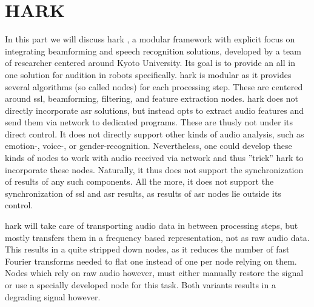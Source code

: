 
\section{HARK}
\label{related:frameworks}
In this part we will discuss \gls{hark} \cite{Nakadai_2017jrm}, a modular framework with explicit focus on integrating beamforming and speech recognition solutions, developed by a team of researcher centered around Kyoto University.
Its goal is to provide an all in one solution for audition in robots specifically.
\gls{hark} is modular as it provides several algorithms (so called nodes) for each processing step.
These are centered around \gls{ssl}, beamforming, filtering, and feature extraction nodes.
\gls{hark} does not directly incorporate \gls{asr} solutions, but instead opts to extract audio features and send them via network to dedicated programs.
These are thusly not under its direct control.
It does not directly support other kinds of audio analysis, such as emotion-, voice-, or gender-recognition.
Nevertheless, one could develop these kinds of nodes to work with audio received via network and thus ''trick'' \gls{hark} to incorporate these nodes.
Naturally, it thus does not support the synchronization of results of any such components.
All the more, it does not support the synchronization of \gls{ssl} and \gls{asr} results, as results of \gls{asr} nodes lie outside its control.

\gls{hark} will take care of transporting audio data in between processing steps, but mostly transfers them in a frequency based representation, not as raw audio data.
This results in a quite stripped down nodes, as it reduces the number of fast Fourier transforms needed to flat one instead of one per node relying on them.
Nodes which rely on raw audio however, must either manually restore the signal or use a specially developed node for this task.
Both variants results in a degrading signal however.



